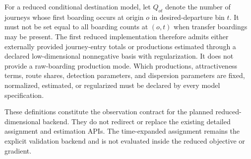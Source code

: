 For a reduced conditional destination model, let $Q_{ot}$ denote the number of
journeys whose first boarding occurs at origin $o$ in desired-departure bin
$t$.  It must not be set equal to all boarding counts at $(o,t)$ when transfer
boardings may be present.  The first reduced implementation therefore admits
either externally provided journey-entry totals or productions estimated
through a declared low-dimensional nonnegative basis with regularization.  It
does not provide a raw-boarding production mode.  Which productions,
attractiveness terms, route shares, detection parameters, and dispersion
parameters are fixed, normalized, estimated, or regularized must be declared
by every model specification.

These definitions constitute the observation contract for the planned
reduced-dimensional backend.  They do not redirect or replace the existing
detailed assignment and estimation APIs.  The time-expanded assignment remains
the explicit validation backend and is not evaluated inside the reduced
objective or gradient.

